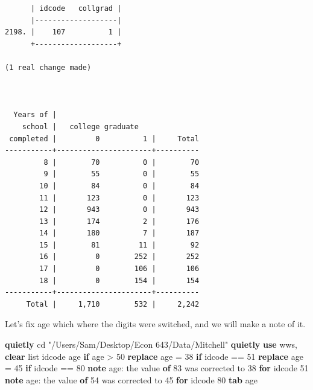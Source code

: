 \documentclass[
]{book}
\newenvironment{Shaded}{\begin{snugshade}}{\end{snugshade}}
\newcommand{\KeywordTok}[1]{\textcolor[rgb]{0.13,0.29,0.53}{\textbf{#1}}}
\newcommand{\NormalTok}[1]{#1}
\newcommand{\OtherTok}[1]{\textcolor[rgb]{0.56,0.35,0.01}{#1}}
\newcommand{\StringTok}[1]{\textcolor[rgb]{0.31,0.60,0.02}{#1}}
\begin{document}
\begin{verbatim}
      | idcode   collgrad |
      |-------------------|
2198. |    107          1 |
      +-------------------+

(1 real change made)



  Years of |
    school |   college graduate
 completed |         0          1 |     Total
-----------+----------------------+----------
         8 |        70          0 |        70 
         9 |        55          0 |        55 
        10 |        84          0 |        84 
        11 |       123          0 |       123 
        12 |       943          0 |       943 
        13 |       174          2 |       176 
        14 |       180          7 |       187 
        15 |        81         11 |        92 
        16 |         0        252 |       252 
        17 |         0        106 |       106 
        18 |         0        154 |       154 
-----------+----------------------+----------
     Total |     1,710        532 |     2,242 
\end{verbatim}

Let's fix age which where the digits were switched, and we will make a note of it.

\begin{Shaded}
\begin{Highlighting}[]
\KeywordTok{quietly}\NormalTok{ cd }\StringTok{"/Users/Sam/Desktop/Econ 643/Data/Mitchell"}
\KeywordTok{quietly} \KeywordTok{use}\NormalTok{ wws, }\KeywordTok{clear}
\OtherTok{list}\NormalTok{ idcode age }\KeywordTok{if}\NormalTok{ age \textgreater{} 50}
\KeywordTok{replace}\NormalTok{ age = 38 }\KeywordTok{if}\NormalTok{ idcode == 51}
\KeywordTok{replace}\NormalTok{ age = 45 }\KeywordTok{if}\NormalTok{ idcode == 80}
\KeywordTok{note}\NormalTok{ age: the }\OtherTok{value} \KeywordTok{of}\NormalTok{ 83 was corrected to 38 }\KeywordTok{for}\NormalTok{ idcode 51}
\KeywordTok{note}\NormalTok{ age: the }\OtherTok{value} \KeywordTok{of}\NormalTok{ 54 was corrected to 45 }\KeywordTok{for}\NormalTok{ idcode 80}
\KeywordTok{tab}\NormalTok{ age}
\end{Highlighting}
\end{Shaded}
\end{document}
